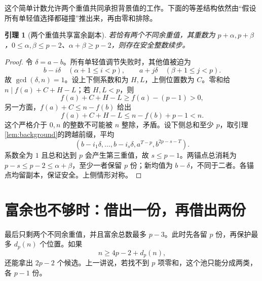 \documentclass[11pt,a4paper,oneside,openany]{book}
\newtheorem{lemma}[theorem]{引理}
\theoremstyle{definition}
\numberwithin{equation}{chapter}
\begin{document}
这个简单计数允许两个重值共同承担背景值的工作。下面的等差结构依然由“假设所有单轻值选择都碰撞”推出来，再由零和排除。
\begin{lemma}[两个重值共享富余副本]\label{lem:two-heavy}
若恰有两个不同余重值，其重数为 $p+\alpha,p+\beta$，$0\le\alpha,\beta\le p-2$、$\alpha+\beta\ge p-2$，则存在安全整数续步。
\end{lemma}
\begin{proof}
令 $\delta=a-b$。所有单轻值调节失败时，其他值被迫为
\[
b-i\delta\quad(\alpha+1\le i<p),\qquad
a+j\delta\quad(\beta+1\le j<p).
\]
故 $\gcd(\delta,n)=1$。设上下侧系数和为 $H,L$，上侧位置数为 $C$。零和给 $n\mid f(a)+C+H-L$；若 $H,L<p$，则
\[
f(a)+C+H-L\ge f(a)-(p-1)>0,
\]
另一方面，$f(a)+C\le n-f(b)$ 给出
\[
f(a)+C+H-L\le n-f(b)+p-1<n.
\]
这个严格介于 $0,n$ 的整数不可能被 $n$ 整除，矛盾。设下侧总和至少 $p$，取引理\ref{lem:background}的跨越前缀，平均
\[(b-i_1\delta,\ldots,b-i_s\delta,a^{T-p},b^{2p-s-T}).
\]
系数全为 $1$ 且总和达到 $p$ 会产生第三重值，故 $s\le p-1$。两锚点总消耗为 $p-s\le p-2\le\alpha+\beta$，至少一者保留 $p$ 份；新均值为 $b-\delta$，不同于二者。各锚点均留副本，保证安全。上侧情形对称。
\end{proof}

\section{富余也不够时：借出一份，再借出两份}
最后只剩两个不同余重值，并且富余总数最多 $p-3$。此时先各留 $p$ 份，再保护最多 $d_p(n)$ 个位置。如果
\[n\ge4p-2+d_p(n),
\]
还能拿出 $2p-2$ 个候选。上一讲说，若找不到 $p$ 项零和，这个池只能分成两类，各 $p-1$ 份。
\end{document}
